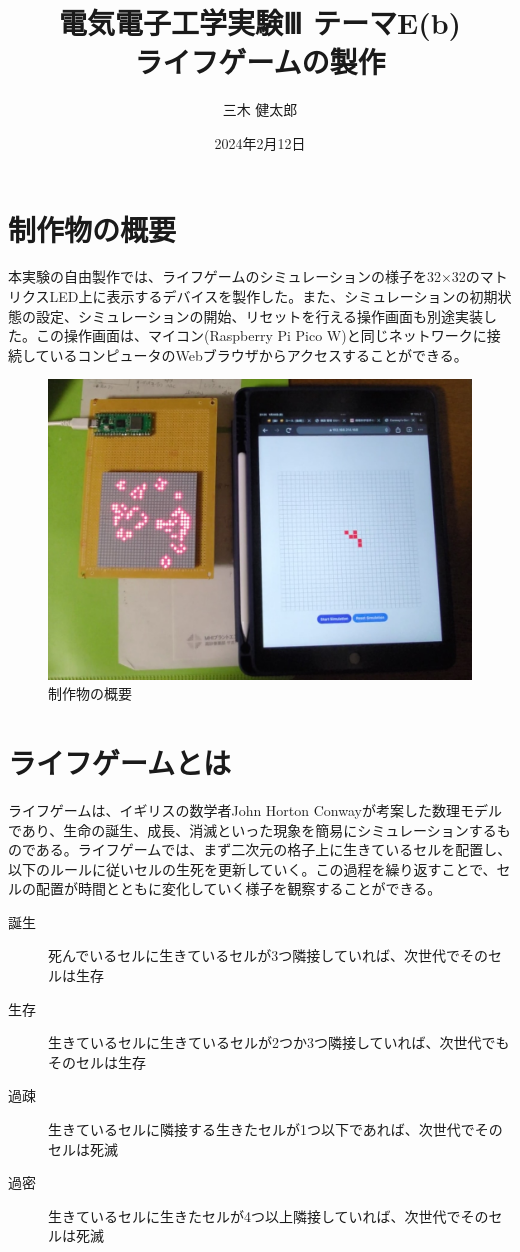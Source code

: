 \documentclass{jlreq}
\title{電気電子工学実験Ⅲ テーマE(b) \\ ライフゲームの製作}
\author{三木 健太郎}
\date{2024年2月12日}
\begin{document}
\maketitle

\section{制作物の概要}
本実験の自由製作では、ライフゲームのシミュレーションの様子を32×32のマトリクスLED上に表示するデバイスを製作した。また、シミュレーションの初期状態の設定、シミュレーションの開始、リセットを行える操作画面も別途実装した。この操作画面は、マイコン(Raspberry Pi Pico W)と同じネットワークに接続しているコンピュータのWebブラウザからアクセスすることができる。\\

\begin{figure}[h]
    \begin{center}
        \includegraphics[width=120mm]{img/life-game-indicator.jpg}
    \end{center}
    \caption{制作物の概要}
    \label{img:overall}
\end{figure}

\section{ライフゲームとは}
ライフゲームは、イギリスの数学者John Horton Conwayが考案した数理モデルであり、生命の誕生、成長、消滅といった現象を簡易にシミュレーションするものである。ライフゲームでは、まず二次元の格子上に生きているセルを配置し、以下のルールに従いセルの生死を更新していく。この過程を繰り返すことで、セルの配置が時間とともに変化していく様子を観察することができる。

\begin{description}
    \item[誕生] 死んでいるセルに生きているセルが3つ隣接していれば、次世代でそのセルは生存
    \item[生存] 生きているセルに生きているセルが2つか3つ隣接していれば、次世代でもそのセルは生存
    \item[過疎] 生きているセルに隣接する生きたセルが1つ以下であれば、次世代でそのセルは死滅
    \item[過密] 生きているセルに生きたセルが4つ以上隣接していれば、次世代でそのセルは死滅
\end{description}
\end{document}
